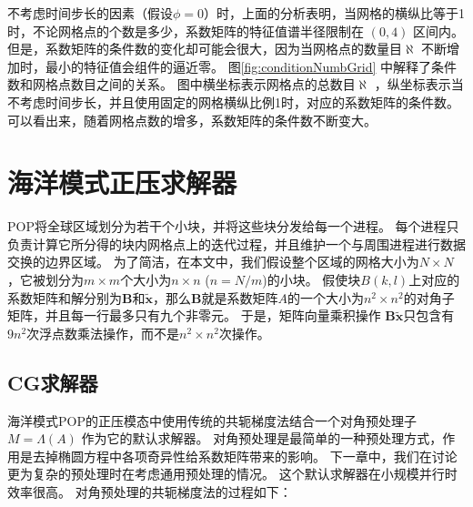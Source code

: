 不考虑时间步长的因素（假设$\phi=0$）时，上面的分析表明，当网格的横纵比等于1时，不论网格点的个数是多少，系数矩阵的特征值谱半径限制在 $(0,4)$ 区间内。
但是，系数矩阵的条件数的变化却可能会很大，因为当网格点的数量目$\aleph$ 不断增加时，最小的特征值会组件的逼近零。 
图\ref{fig:conditionNumbGrid} 中解释了条件数和网格点数目之间的关系。 
图中横坐标表示网格点的总数目$\aleph$ ，纵坐标表示当不考虑时间步长，并且使用固定的网格横纵比例1时，对应的系数矩阵的条件数。
可以看出来，随着网格点数的增多，系数矩阵的条件数不断变大。



\section{海洋模式正压求解器}
\label{solver:bottleneck}

POP将全球区域划分为若干个小块，并将这些块分发给每一个进程。
每个进程只负责计算它所分得的块内网格点上的迭代过程，并且维护一个与周围进程进行数据交换的边界区域。 
为了简洁，在本文中，我们假设整个区域的网格大小为$N\times N$，它被划分为$m\times m$个大小为$n\times n$ ($n=N/m$)的小块。 
假使块$B(k,l)$上对应的系数矩阵和解分别为$\textbf{B}$和$\tilde{\textbf{x}}$，那么$\textbf{B}$就是系数矩阵$A$的一个大小为$n^2\times n^2$的对角子矩阵，并且每一行最多只有九个非零元\cite{hu2013scalable}。 
于是，矩阵向量乘积操作 $\textbf{B}\tilde{\textbf{x}}$只包含有$9n^2$次浮点数乘法操作，而不是$n^2\times n^2$次操作。 
 
\subsection{CG求解器} 
\label{solver:pcg}
 
海洋模式POP的正压模态中使用传统的共轭梯度法结合一个对角预处理子$M = \Lambda(A)$ 作为它的默认求解器。 
对角预处理是最简单的一种预处理方式，作用是去掉椭圆方程中各项奇异性给系数矩阵带来的影响。
下一章中，我们在讨论更为复杂的预处理时在考虑通用预处理的情况。
这个默认求解器在小规模并行时效率很高。 
对角预处理的共轭梯度法的过程如下： 

